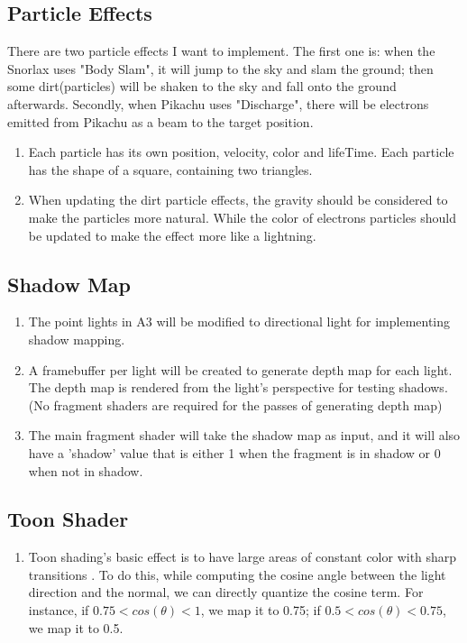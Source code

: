 \documentclass {article}
\begin{document}
     \subsection{Particle Effects}
     There are two particle effects I want to implement. The first one is: when the Snorlax uses "Body Slam", it will
     jump to the sky and slam the ground; then some dirt(particles) will be shaken to the sky and fall onto the ground afterwards.
     Secondly, when Pikachu uses "Discharge", there will be electrons emitted from Pikachu as a beam to the target position.
     \begin{enumerate}
        \item Each particle has its own position, velocity, color and lifeTime. Each particle has the shape of a square, containing two triangles.
        \item When updating the dirt particle effects, the gravity should be considered to make the particles more natural. While the color of electrons particles
            should be updated to make the effect more like a lightning.
     \end{enumerate}

     \subsection{Shadow Map}
     \begin{enumerate}
        \item The point lights in A3 will be modified to directional light for implementing shadow mapping.
        \item A framebuffer per light will be created to generate depth map for each light. The depth map is rendered
        from the light's perspective for testing shadows. (No fragment shaders are required for the passes of generating depth map)
        \item The main fragment shader will take the shadow map as input, and it will also have a 'shadow' value that is either 1 when the fragment is in shadow
        or 0 when not in shadow.
     \end{enumerate}

     \subsection{Toon Shader}
     \begin{enumerate}
        \item Toon shading's basic effect is to have large areas of constant color with sharp transitions
        . To do this, while computing the cosine angle between the light direction and the normal, we can directly
        quantize the cosine term. For instance, if $0.75 < cos(\theta) < 1$, we map it to 0.75; if $ 0.5<cos(\theta) <0.75 $, we map it to 0.5.
     \end{enumerate}
\end{document}
